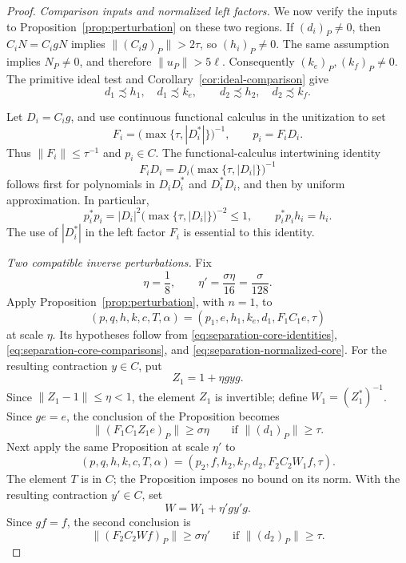 \begin{proof}
\medskip\noindent\textit{Comparison inputs and normalized left factors.}
We now verify the inputs to Proposition~\ref{prop:perturbation}
on these two regions.
If $(d_i)_P\ne0$, then $C_iN=C_igN$ implies
$\|(C_ig)_P\|>2\tau$, so $(h_i)_P\ne0$.  The same assumption
implies $N_P\ne0$, and therefore $\|u_P\|>5\ell$.
Consequently $(k_e)_P,(k_f)_P\ne0$.
The primitive ideal test and Corollary~\ref{cor:ideal-comparison} give
\begin{equation}\label{eq:separation-core-comparisons}
 d_1\precsim h_1,\quad d_1\precsim k_e,\qquad
 d_2\precsim h_2,\quad d_2\precsim k_f.
\end{equation}

Let $D_i=C_ig$, and use continuous functional calculus in the
unitization to set
\begin{equation}\label{eq:separation-left-normalization}
 F_i=\bigl(\max\{\tau,|D_i^*|\}\bigr)^{-1},\qquad
 p_i=F_iD_i.
\end{equation}
Thus $\|F_i\|\le\tau^{-1}$ and $p_i\in C$.
The functional-calculus intertwining identity
\[
 F_iD_i=D_i\bigl(\max\{\tau,|D_i|\}\bigr)^{-1}
\]
follows first for polynomials in $D_iD_i^*$ and $D_i^*D_i$, and then
by uniform approximation.  In particular,
\begin{equation}\label{eq:separation-normalized-core}
 p_i^*p_i=|D_i|^2\bigl(\max\{\tau,|D_i|\}\bigr)^{-2}\le1,
 \qquad p_i^*p_ih_i=h_i.
\end{equation}
The use of $|D_i^*|$ in the left factor $F_i$ is essential to this
identity.

\medskip\noindent\textit{Two compatible inverse perturbations.}
Fix
\[
 \eta=\frac18,\qquad \eta'=\frac{\sigma\eta}{16}
 =\frac{\sigma}{128}.
\]
Apply Proposition~\ref{prop:perturbation}, with $n=1$, to
\[
 (p,q,h,k,c,T,\alpha)
 =(p_1,e,h_1,k_e,d_1,F_1C_1e,\tau)
\]
at scale $\eta$.  Its hypotheses follow from
\eqref{eq:separation-core-identities},
\eqref{eq:separation-core-comparisons}, and
\eqref{eq:separation-normalized-core}.
For the resulting contraction $y\in C$, put
\[
 Z_1=1+\eta gyg.
\]
Since $\|Z_1-1\|\le\eta<1$, the element $Z_1$ is invertible;
define $W_1=(Z_1^*)^{-1}$.  Since $ge=e$,
the conclusion of the Proposition becomes
\begin{equation}\label{eq:separation-first-test}
 \|(F_1C_1Z_1e)_P\|\ge\sigma\eta
 \qquad\text{if }\|(d_1)_P\|\ge\tau.
\end{equation}
Next apply the same Proposition at scale $\eta'$ to
\[
 (p,q,h,k,c,T,\alpha)
 =(p_2,f,h_2,k_f,d_2,F_2C_2W_1f,\tau).
\]
The element $T$ is in $C$; the Proposition imposes no bound on its
norm.  With the resulting contraction $y'\in C$, set
\[
 W=W_1+\eta'gy'g.
\]
Since $gf=f$, the second conclusion is
\begin{equation}\label{eq:separation-second-test}
 \|(F_2C_2Wf)_P\|\ge\sigma\eta'
 \qquad\text{if }\|(d_2)_P\|\ge\tau.
\end{equation}


\end{proof}
